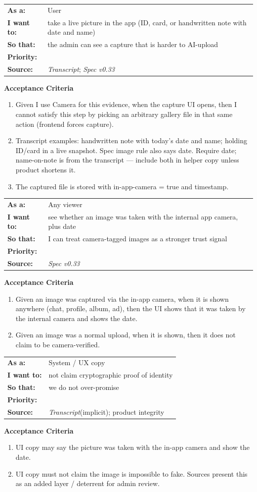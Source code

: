 \documentclass[11pt,a4paper]{article}
\makeatletter
\newcommand{\priPzero}{\colorbox{p0}{\makebox[4.6em]{\textcolor{white}{\scriptsize\bfseries P0 V1}}}}
\newcommand{\srcSpec}{\textit{Spec v0.33}}
\newcommand{\srcTx}{\textit{Transcript}}
\newenvironment{story}[1]{%
  \Needspace{10\baselineskip}%
  \vspace{0.7em}%
  \noindent
  \colorbox{navy}{\makebox[\dimexpr\textwidth-2\fboxsep\relax][l]{\textcolor{white}{\bfseries\ #1}}}%
  \par\vspace{0.35em}%
}{\par\vspace{0.55em}}
\newcommand{\storymeta}[5]{%
  \noindent
  \begin{tabularx}{\textwidth}{@{}>{\bfseries}l X@{}}
    As a: & #1 \\
    I want to: & #2 \\
    So that: & #3 \\
    Priority: & #4 \\
    Source: & #5 \\
  \end{tabularx}
  \par\vspace{0.3em}
}
\newcommand{\achead}{\noindent\textbf{Acceptance Criteria}\par}
\makeatother
\begin{document}
\begin{story}{VERIFY-003 --- In-app camera capture for verification evidence}
\storymeta{User}{take a live picture in the app (ID, card, or handwritten note with date and name)}{the admin can see a capture that is harder to AI-upload}{\priPzero}{\srcTx; \srcSpec}
\achead
\begin{enumerate}
  \item Given I use Camera for this evidence, when the capture UI opens, then I cannot satisfy this step by picking an arbitrary gallery file in that same action (frontend forces capture).
  \item Transcript examples: handwritten note with today's date and name; holding ID/card in a live snapshot. Spec image rule also says date. Require date; name-on-note is from the transcript --- include both in helper copy unless product shortens it.
  \item The captured file is stored with in-app-camera = true and timestamp.
\end{enumerate}
\end{story}

\begin{story}{VERIFY-004 --- Verified indicator on every image}
\storymeta{Any viewer}{see whether an image was taken with the internal app camera, plus date}{I can treat camera-tagged images as a stronger trust signal}{\priPzero}{\srcSpec}
\achead
\begin{enumerate}
  \item Given an image was captured via the in-app camera, when it is shown anywhere (chat, profile, album, ad), then the UI shows that it was taken by the internal camera and shows the date.
  \item Given an image was a normal upload, when it is shown, then it does not claim to be camera-verified.
\end{enumerate}
\end{story}

\begin{story}{VERIFY-005 --- Honest meaning of ``verified picture''}
\storymeta{System / UX copy}{not claim cryptographic proof of identity}{we do not over-promise}{\priPzero}{\srcTx (implicit); product integrity}
\achead
\begin{enumerate}
  \item UI copy may say the picture was taken with the in-app camera and show the date.
  \item UI copy must not claim the image is impossible to fake. Sources present this as an added layer / deterrent for admin review.
\end{enumerate}
\end{story}
\end{document}
